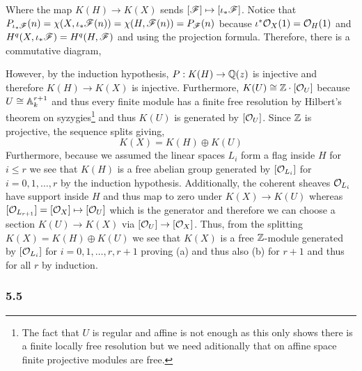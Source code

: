 \documentclass[12pt]{article}
\begin{document}
Where the map $K(H) \to K(X)$ sends $[\mathscr{F}] \mapsto [\iota_* \mathscr{F}]$. Notice that $P_{\iota_* \mathscr{F}}(n) = \chi(X, \iota_* \mathscr{F}(n)) = \chi(H, \mathscr{F}(n)) = P_{\mathscr{F}}(n)$ because $\iota^* \mathcal{O}_{X}(1) = \mathcal{O}_{H}(1)$ and $H^q(X, \iota_* \mathscr{F}) = H^q(H, \mathscr{F})$ and using the projection formula. Therefore, there is a commutative diagram,
\begin{center}
\end{center}
However, by the induction hypothesis, $P : K(H) \to \mathbb{Q}(z)$ is injective and therefore $K(H) \to K(X)$ is injective. Furthermore, $K(U) \cong \mathbb{Z} \cdot [\mathcal{O}_{U}]$ because $U \cong \mathbb{A}^{r+1}_k$ and thus every finite module has a finite free resolution by Hilbert's theorem on syzygies\footnote{The fact that $U$ is regular and affine is not enough as this only shows there is a finite locally free resolution but we need aditionally that on affine space finite projective modules are free.} and thus $K(U)$ is generated by $[\mathcal{O}_{U}]$. Since $\mathbb{Z}$ is projective, the sequence splits giving,
\[ K(X) = K(H) \oplus K(U) \]
Furthermore, because we assumed the linear spaces $L_i$ form a flag inside $H$ for $i \le r$ we see that $K(H)$ is a free abelian group generated by $[\mathcal{O}_{L_i}]$ for $i = 0,1, \dots, r$ by the induction hypothesis. Additionally, the coherent sheaves $\mathcal{O}_{L_i}$ have support inside $H$ and thus map to zero under $K(X) \to K(U)$ whereas $[\mathcal{O}_{L_{r+1}}] = [\mathcal{O}_{X}] \mapsto [\mathcal{O}_{U}]$ which is the generator and therefore we can choose a section $K(U) \to K(X)$ via $[\mathcal{O}_{U}] \to [\mathcal{O}_{X}]$. Thus, from the splitting $K(X) = K(H) \oplus K(U)$ we see that $K(X)$ is a free $\mathbb{Z}$-module generated by $[\mathcal{O}_{L_i}]$ for $i = 0,1, \dots, r, r+1$ proving (a) and thus also (b) for $r + 1$ and thus for all $r$ by induction.

\subsubsection{5.5}
\end{document}
